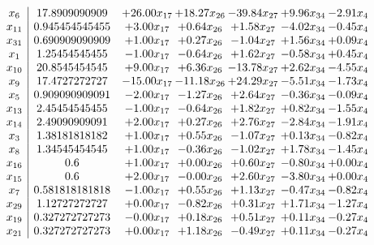 \documentclass[8pt]{article}
\begin{document}
\[\begin{array}{c| c c@{\hskip 2pt} c@{\hskip 2pt} c@{\hskip 2pt} c@{\hskip 2pt} c@{\hskip 2pt} }
 x_{6}   &  17.8909090909 & + 26.00 x_{17} & + 18.27 x_{26} & -39.84 x_{27} & +  9.96 x_{34} & -2.91 x_{4}\\
 x_{11}   &  0.945454545455 & +  3.00 x_{17} & +  0.64 x_{26} & +  1.58 x_{27} & -4.02 x_{34} & -0.45 x_{4}\\
 x_{31}   &  0.690909090909 & +  1.00 x_{17} & +  0.27 x_{26} & -1.04 x_{27} & +  1.56 x_{34} & +  0.09 x_{4}\\
 x_{1}   &  1.25454545455 & -1.00 x_{17} & -0.64 x_{26} & +  1.62 x_{27} & -0.58 x_{34} & +  0.45 x_{4}\\
 x_{10}   &  20.8545454545 & +  9.00 x_{17} & +  6.36 x_{26} & -13.78 x_{27} & +  2.62 x_{34} & -4.55 x_{4}\\
 x_{9}   &  17.4727272727 & -15.00 x_{17} & -11.18 x_{26} & + 24.29 x_{27} & -5.51 x_{34} & -1.73 x_{4}\\
 x_{5}   &  0.909090909091 & -2.00 x_{17} & -1.27 x_{26} & +  2.64 x_{27} & -0.36 x_{34} & -0.09 x_{4}\\
 x_{13}   &  2.45454545455 & -1.00 x_{17} & -0.64 x_{26} & +  1.82 x_{27} & +  0.82 x_{34} & -1.55 x_{4}\\
 x_{14}   &  2.49090909091 & +  2.00 x_{17} & +  0.27 x_{26} & +  2.76 x_{27} & -2.84 x_{34} & -1.91 x_{4}\\
 x_{3}   &  1.38181818182 & +  1.00 x_{17} & +  0.55 x_{26} & -1.07 x_{27} & +  0.13 x_{34} & -0.82 x_{4}\\
 x_{8}   &  1.34545454545 & +  1.00 x_{17} & -0.36 x_{26} & -1.02 x_{27} & +  1.78 x_{34} & -1.45 x_{4}\\
 x_{16}   &  0.6 & +  1.00 x_{17} & +  0.00 x_{26} & +  0.60 x_{27} & -0.80 x_{34} & +  0.00 x_{4}\\
 x_{15}   &  0.6 & +  2.00 x_{17} & -0.00 x_{26} & +  2.60 x_{27} & -3.80 x_{34} & +  0.00 x_{4}\\
 x_{7}   &  0.581818181818 & -1.00 x_{17} & +  0.55 x_{26} & +  1.13 x_{27} & -0.47 x_{34} & -0.82 x_{4}\\
 x_{29}   &  1.12727272727 & +  0.00 x_{17} & -0.82 x_{26} & +  0.31 x_{27} & +  1.71 x_{34} & -1.27 x_{4}\\
 x_{19}   &  0.327272727273 & -0.00 x_{17} & +  0.18 x_{26} & +  0.51 x_{27} & +  0.11 x_{34} & -0.27 x_{4}\\
 x_{21}   &  0.327272727273 & +  0.00 x_{17} & +  1.18 x_{26} & -0.49 x_{27} & +  0.11 x_{34} & -0.27 x_{4}\\

\end{array}\]
\end{document}
